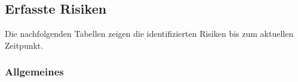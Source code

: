 \documentclass[main.tex]{subfiles} %
\begin{document}

\subsection{Erfasste Risiken}

Die nachfolgenden Tabellen zeigen die identifizierten Risiken bis zum aktuellen
Zeitpunkt. \\


\subsubsection*{Allgemeines}

\setcounter{Erfasste_Risiken_counter_allg}{0}
\end{document}
